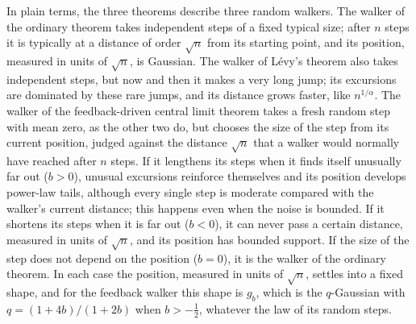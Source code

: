\documentclass[aip,jmp,preprint,onecolumn,floatfix,superscriptaddress,nofootinbib,11pt]{revtex4-2}
\theoremstyle{plain}
\theoremstyle{remark}
\numberwithin{equation}{section}
\begin{document}
In plain terms, the three theorems describe three random walkers. The walker of the ordinary theorem takes independent steps of a fixed typical size; after $n$ steps it is typically at a distance of order $\sqrt n$ from its starting point, and its position, measured in units of $\sqrt n$, is Gaussian. The walker of L\'evy's theorem also takes independent steps, but now and then it makes a very long jump; its excursions are dominated by these rare jumps, and its distance grows faster, like $n^{1/\alpha}$. The walker of the feedback-driven central limit theorem takes a fresh random step with mean zero, as the other two do, but chooses the size of the step from its current position, judged against the distance $\sqrt n$ that a walker would normally have reached after $n$ steps. If it lengthens its steps when it finds itself unusually far out ($b>0$), unusual excursions reinforce themselves and its position develops power-law tails, although every single step is moderate compared with the walker's current distance; this happens even when the noise is bounded. If it shortens its steps when it is far out ($b<0$), it can never pass a certain distance, measured in units of $\sqrt n$, and its position has bounded support. If the size of the step does not depend on the position ($b=0$), it is the walker of the ordinary theorem. In each case the position, measured in units of $\sqrt n$, settles into a fixed shape, and for the feedback walker this shape is $g_b$, which is the $q$-Gaussian with $q=(1+4b)/(1+2b)$ when $b>-\tfrac12$, whatever the law of its random steps.
 
\end{document}
